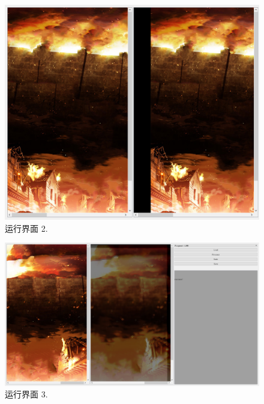 \documentclass[14pt,a4paper]{article}
\begin{document}
\begin{figure}[h]
\begin{center}
\includegraphics[width=\textwidth]{image/2} 
\caption{运行界面 2.}
\end{center}
\end{figure}

\begin{figure}[h]
\begin{center}
\includegraphics[width=\textwidth]{image/3} 
\caption{运行界面 3.}
\end{center}
\end{figure}
\end{document}
